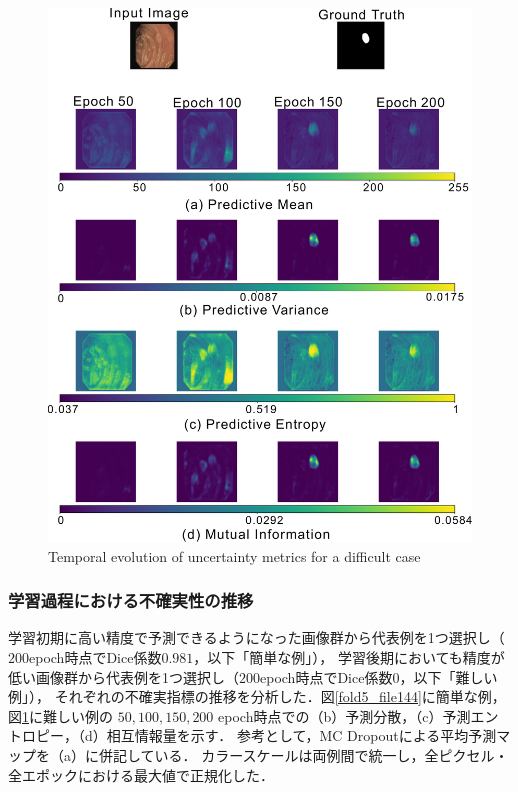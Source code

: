 \documentclass[10pt, a4paper, twocolumn]{jarticle}
\begin{document}
\begin{figure}[t] %
  \begin{center}
    \includegraphics[width=\hsize]{figure/fold2_file450_uncertainty_evolution.pdf}
    \caption{Temporal evolution of uncertainty metrics for a difficult case}
    \label{fold2_file450}
  \end{center}
\end{figure}


\subsubsection{学習過程における不確実性の推移}
学習初期に高い精度で予測できるようになった画像群から代表例を1つ選択し（$200$epoch時点でDice係数$0.981$，以下「簡単な例」），
学習後期においても精度が低い画像群から代表例を1つ選択し（$200$epoch時点でDice係数$0$，以下「難しい例」），
それぞれの不確実指標の推移を分析した．図\ref{fold5_file144}に簡単な例，図\ref{fold2_file450}に難しい例の
$50, 100, 150, 200$ epoch時点での（b）予測分散，（c）予測エントロピー，（d）相互情報量を示す．
参考として，MC Dropoutによる平均予測マップを（a）に併記している．
カラースケールは両例間で統一し，全ピクセル・全エポックにおける最大値で正規化した．
\end{document}
